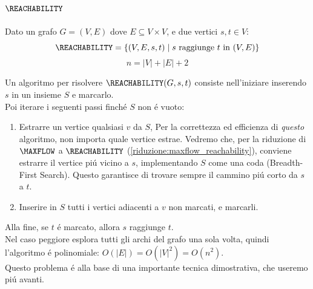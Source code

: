 \subsection{$\REACHABILITY$}
\label{problema:reachability}
Dato un grafo $G = (V, E)$ dove $E \subseteq V \times V$, e due vertici $s, t \in V$:
\[
\REACHABILITY = \{ (V, E, s, t) \mid s \text{ raggiunge } t \text{ in } (V, E) \} 
\]
\[
n = |V| + |E| + 2
\]

Un algoritmo per risolvere $\REACHABILITY(G, s, t)$ consiste nell'iniziare inserendo $s$ in un insieme $S$ e marcarlo. \\
Poi iterare i seguenti passi finché $S$ non é vuoto:
\begin{enumerate}
    \item Estrarre un vertice qualsiasi $v$ da $S$,
        \subitem Per la correttezza ed efficienza di \textit{questo} algoritmo, non importa quale vertice estrae. 
        Vedremo che, per la riduzione di $\MAXFLOW$ a $\REACHABILITY$ 
        (\ref{riduzione:maxflow_reachability}), 
        conviene estrarre il vertice piú vicino a $s$,
        implementando $S$ come una coda (Breadth-First Search).
        Questo garantisce di trovare sempre il cammino piú corto da $s$ a $t$.
    \item Inserire in $S$ tutti i vertici adiacenti a $v$ non marcati, e marcarli.
\end{enumerate}
Alla fine, se $t$ é marcato, allora $s$ raggiunge $t$. \\
Nel caso peggiore esplora tutti gli archi del grafo una sola volta, quindi l'algoritmo é polinomiale: $O(|E|) = O(|V|^2) = O(n^2)$. \\

Questo problema é alla base di una importante tecnica dimostrativa, che useremo piú avanti.


\newpage
